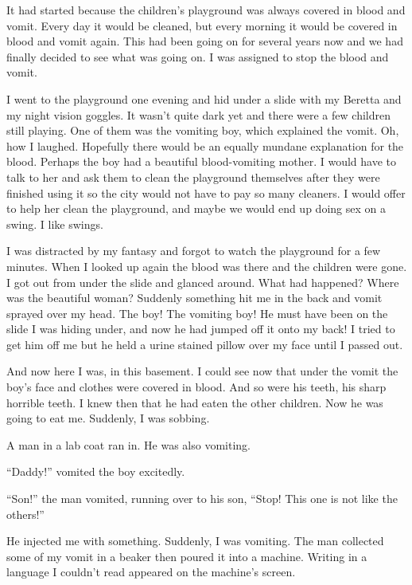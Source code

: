 It had started because the children's playground was always
covered in blood and vomit. Every day it would be cleaned, but
every morning it would be covered in blood and vomit again. This
had been going on for several years now and we had finally decided
to see what was going on. I was assigned to stop the blood and
vomit.



I went to the playground one evening and hid under a slide with my
Beretta and my night vision goggles. It wasn't quite dark yet
and there were a few children still playing. One of them was the
vomiting boy, which explained the vomit. Oh, how I laughed.
Hopefully there would be an equally mundane explanation for the
blood. Perhaps the boy had a beautiful blood-vomiting mother. I
would have to talk to her and ask them to clean the playground
themselves after they were finished using it so the city would not
have to pay so many cleaners. I would offer to help her clean the
playground, and maybe we would end up doing sex on a swing. I like
swings.



I was distracted by my fantasy and forgot to watch the playground
for a few minutes. When I looked up again the blood was there and
the children were gone. I got out from under the slide and glanced
around. What had happened? Where was the beautiful woman? Suddenly
something hit me in the back and vomit sprayed over my head. The
boy! The vomiting boy! He must have been on the slide I was hiding
under, and now he had jumped off it onto my back! I tried to get
him off me but he held a urine stained pillow over my face until I
passed out.



And now here I was, in this basement. I could see now that under
the vomit the boy's face and clothes were covered in blood.
And so were his teeth, his sharp horrible teeth. I knew then that
he had eaten the other children. Now he was going to eat me.
Suddenly, I was sobbing.



A man in a lab coat ran in. He was also vomiting.



``Daddy!'' vomited the boy excitedly.



``Son!'' the man vomited, running over to his son,
``Stop! This one is not like the others!''



He injected me with something. Suddenly, I was vomiting. The man
collected some of my vomit in a beaker then poured it into a
machine. Writing in a language I couldn't read appeared on
the machine's screen.



